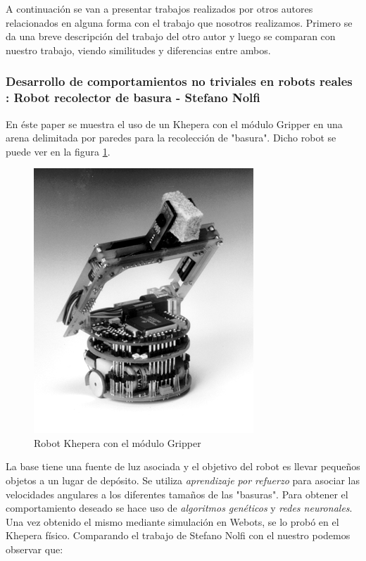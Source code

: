 A continuaci\'on se van a presentar trabajos realizados por otros autores relacionados en alguna
forma con el trabajo que nosotros realizamos. Primero se da una breve descripci\'on del trabajo
del otro autor y luego se comparan con nuestro trabajo, viendo similitudes y diferencias entre ambos.

\subsubsection{Desarrollo de comportamientos no triviales en robots reales : Robot recolector de basura - Stefano Nolfi \cite{nolfi:evolving}}
En \'este paper se muestra el uso de un Khepera con el m\'odulo Gripper en una arena delimitada por
paredes para la recolecci\'on de "basura". Dicho robot se puede ver en la figura \ref{fig:khepera}.
\begin{figure}[htp]
\begin{center}
\includegraphics[scale=0.6]{comportamientos/gripperAH.png}
\caption{Robot Khepera con el m\'odulo Gripper}
\label{fig:khepera}
\end{center}
\end{figure}
La base tiene una fuente de luz asociada y el objetivo del
robot es llevar peque\~nos objetos a un lugar de dep\'osito. Se utiliza \emph{aprendizaje por refuerzo} para
asociar las velocidades angulares a los diferentes tama\~nos de las "basuras". Para obtener el comportamiento
deseado se hace uso de \emph{algoritmos gen\'eticos} y \emph{redes neuronales}. Una vez obtenido el mismo mediante
simulaci\'on en Webots, se lo prob\'o en el Khepera f\'isico.
Comparando el trabajo de Stefano Nolfi con el nuestro podemos observar que:
